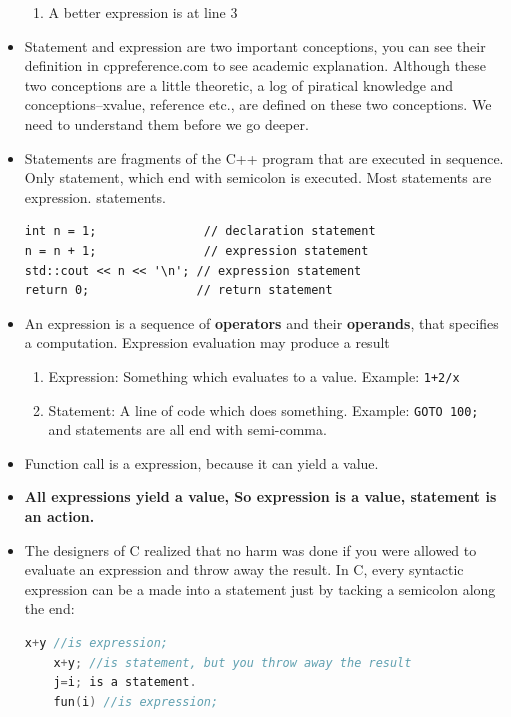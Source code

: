 \documentclass[a4paper,11pt,twoside]{book}
\begin{document}
\begin{itemize}
\begin{enumerate}
	\item A better expression is at line 3 
\end{enumerate}

	\item Statement and expression are two important conceptions, you can see their definition in cppreference.com to see academic explanation. Although these two conceptions are a little theoretic, a log of piratical knowledge and conceptions--xvalue, reference etc., are defined on these two conceptions. We need to understand them before we go deeper. 
	
	\item Statements are fragments of the C++ program that are executed in sequence. Only statement, which end with semicolon is executed. Most statements are expression. statements. 
\begin{lstlisting}
int n = 1;               // declaration statement
n = n + 1;               // expression statement
std::cout << n << '\n'; // expression statement
return 0;               // return statement
\end{lstlisting}
	\item An expression is a sequence of \textbf{operators} and their \textbf{operands}, that specifies a computation. Expression evaluation may produce a result
	
	\begin{enumerate}
		\item Expression: Something which evaluates to a value. Example: \texttt{1+2/x}
		\item Statement: A line of code which does something. Example: \texttt{GOTO 100;} and statements are all end with semi-comma.
	\end{enumerate}
	
	\item Function call is a expression, because it can yield a value.
	
	\item \textbf{All expressions yield a value, So expression is a value, statement is an action.}
	
	
	\item The designers of C realized that no harm was done if you were allowed to evaluate an expression and throw away the result. In C, every syntactic expression can be a made into a statement just by tacking a semicolon along the end:
	
	\begin{lstlisting}[frame=single, language=c++]
	x+y //is expression;
	x+y; //is statement, but you throw away the result
	j=i; is a statement.
	fun(i) //is expression;
	\end{lstlisting} 
	
\end{itemize}
\end{document}
